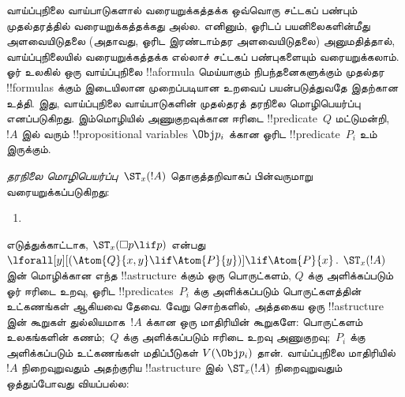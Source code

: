 \documentclass[../../../include/open-logic-section]{subfiles}
\begin{document}


வாய்ப்புநிலை வாய்பாடுகளால் வரையறுக்கத்தக்க ஒவ்வொரு சட்டகப் பண்பும்
முதல்தரத்தில் வரையறுக்கத்தக்கது அல்ல. எனினும், ஓரிடப் பயனிலைகளின்மீது
அளவையிடுதலை (அதாவது, ஓரிட இரண்டாம்தர அளவையிடுதலை) அனுமதித்தால்,
வாய்ப்புநிலையில் வரையறுக்கத்தக்க எல்லாச் சட்டகப் பண்புகளையும் வரையறுக்கலாம்.
ஓர் உலகில் ஒரு வாய்ப்புநிலை !!a{formula} மெய்யாகும் நிபந்தனைகளுக்கும்
முதல்தர !!{formula}s க்கும் இடையிலான முறைப்படியான உறவைப் பயன்படுத்துவதே
இதற்கான உத்தி. இது, வாய்ப்புநிலை வாய்பாடுகளின் முதல்தரத் தரநிலை
மொழிபெயர்ப்பு எனப்படுகிறது. இம்மொழியில் அணுகுறவுக்கான ஈரிடை
!!{predicate}~$Q$ மட்டுமன்றி,~$!A$ இல் வரும் !!{propositional variable}s
$\Obj p_i$ க்கான ஓரிட !!{predicate}~$P_i$ உம் இருக்கும்.

\begin{defn}
  \emph{தரநிலை மொழிபெயர்ப்பு}~$\ST_x(!A)$ தொகுத்தறிவாகப் பின்வருமாறு
  வரையறுக்கப்படுகிறது:
  \begin{enumerate}
  \item {}
  \end{enumerate}
\end{defn}

எடுத்துக்காட்டாக, $\ST_x(\Box p \lif p)$ என்பது
$\lforall[y][(\Atom{Q}{x,y} \lif \Atom{P}{y})] \lif \Atom{P}{x}$.
$\ST_x(!A)$ இன் மொழிக்கான எந்த !!a{structure} க்கும் ஒரு பொருட்களம்,
$Q$ க்கு அளிக்கப்படும் ஓர் ஈரிடை உறவு, ஓரிட !!{predicate}s~$P_i$ க்கு
அளிக்கப்படும் பொருட்களத்தின் உட்கணங்கள் ஆகியவை தேவை. வேறு சொற்களில்,
அத்தகைய ஒரு !!a{structure} இன் கூறுகள் துல்லியமாக~$!A$ க்கான ஒரு
மாதிரியின் கூறுகளே: பொருட்களம் உலகங்களின் கணம்;~$Q$ க்கு அளிக்கப்படும்
ஈரிடை உறவு அணுகுறவு;~$P_i$ க்கு அளிக்கப்படும் உட்கணங்கள் மதிப்பீடுகள்
$V(\Obj p_i)$ தான். வாய்ப்புநிலை மாதிரியில்~$!A$ நிறைவுறுவதும் அதற்குரிய
!!a{structure} இல் $\ST_x(!A)$ நிறைவுறுவதும் ஒத்துப்போவது வியப்பல்ல:
\end{document}
